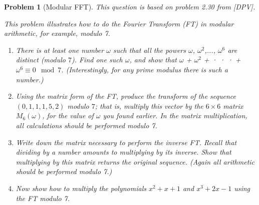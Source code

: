 \documentclass[10pt]{article}
\newtheorem{problem}{\sc\color{cit}Problem}
\begin{document}
\begin{problem}[Modular FFT]
This question is based on problem 2.30 from [DPV].

This problem illustrates how to do the Fourier Transform (FT) in modular arithmetic, for example, modulo 7.
\begin{enumerate}
    \item[(a)] There is at least one number $\omega$ such that all the powers $\omega$, $\omega^2$,..., $\omega^6$ are distinct (modulo $7$). Find one such $\omega$, and show that $\omega$ + $\omega^2$ + · · · + $\omega^6 \equiv 0 \mod 7$. (Interestingly, for any prime modulus there is such a number.)
    \item[(b)] Using the matrix form of the FT, produce the transform of the sequence $(0,1,1,1,5,2)$ modulo $7$; that is, multiply this vector by the $6\times 6$ matrix $M_6(\omega)$, for the value of $\omega$ you found earlier. In the matrix multiplication, all calculations should be performed modulo 7.
    \item[(c)] Write down the matrix necessary to perform the inverse FT. Recall that dividing by a number amounts to multiplying by its inverse. Show that multiplying by this matrix returns the original sequence. (Again all arithmetic should be performed modulo 7.)
    \item[(d)] Now show how to multiply the polynomials $x^2 + x + 1$ and $x^3 + 2x - 1$ using the FT modulo 7.
\end{enumerate}
\end{problem}
\end{document}
